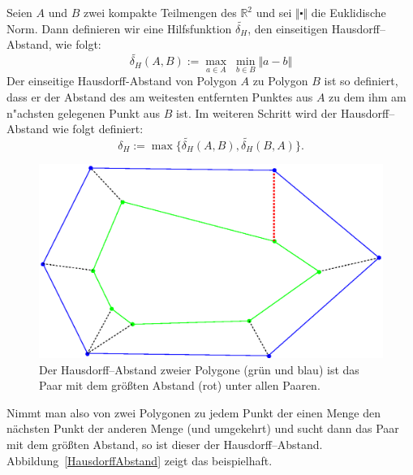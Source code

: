 Seien $A$ und $B$ zwei kompakte Teilmengen des $\mathbb{R}^2$ und sei $\Vert\centerdot\Vert$ die Euklidische Norm.
Dann definieren wir eine Hilfsfunktion $ \widetilde{\delta_H}  $, den einseitigen Hausdorff--Abstand, wie folgt:
\[ \widetilde{\delta_H}(A,B):=\max_{a\in A} \;\min_{b\in B} \Vert a-b \Vert\]
Der einseitige Hausdorff-Abstand von Polygon $A$ zu Polygon $B$ ist so definiert, dass er der Abstand des am weitesten entfernten Punktes aus $A$ zu dem ihm am n"achsten gelegenen Punkt aus $B$ ist.  Im weiteren Schritt wird der Hausdorff--Abstand wie folgt definiert: 
\[\delta_H:=\max\{\widetilde{\delta_H}(A,B),\widetilde{\delta_H}(B,A)\}.\]
\begin{figure}
	\centering
	\includegraphics[scale=.6]{Hausdorff.eps}
	\caption[Der Hausdorff--Abstand zweier Polygone]{Der Hausdorff--Abstand zweier Polygone (grün und blau) ist das Paar mit dem größten Abstand (rot) unter allen Paaren.}
	\label{fig:HausdorffAbstand}
\end{figure}
Nimmt man also von zwei Polygonen zu jedem Punkt der einen Menge den nächsten Punkt der anderen Menge (und umgekehrt) und sucht dann das Paar mit dem größten Abstand, so ist dieser der Hausdorff--Abstand. Abbildung~\ref{HausdorffAbstand} zeigt das beispielhaft.



